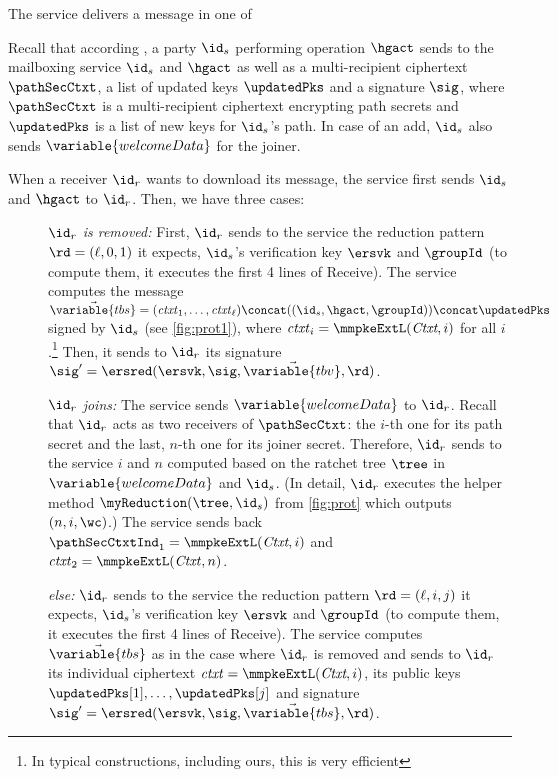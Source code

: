 The service delivers a message in one of

Recall that according \saik, a party $\id_s$ performing operation $\hgact$ sends to the mailboxing service $\id_s$ and $\hgact$ as well as a multi-recipient ciphertext $\pathSecCtxt$, a list of updated keys  $\updatedPks$ and a signature $\sig$, where $\pathSecCtxt$ is a multi-recipient ciphertext encrypting path secrets and $\updatedPks$ is a list of new keys for $\id_s$'s path. In case of an add, $\id_s$ also sends $\variable{welcomeData}$ for the joiner.

When a receiver $\id_r$ wants to download its message, the service first sends $\id_s$ and $\hgact$ to $\id_r$. Then, we have three cases:
\begin{description}
  \item[] {\it $\id_r$ is removed: } First, $\id_r$ sends to the service the reduction pattern $\rd=(\ell,0,1)$ it expects, $\id_s$'s verification key $\ersvk$ and $\groupId$ (to compute them, it executes the first 4 lines of Receive). The service computes the message $\vec{\variable{tbs}} = (\mathit{ctxt}_1,\dots,\mathit{ctxt}_\ell) \concat ((\id_s,\hgact,\groupId)) \concat \updatedPks$ signed by $\id_s$ (see \cref{fig:prot1}), where $\mathit{ctxt}_i = \mmpkeExtL(\textit{Ctxt},i)$ for all $i$.\footnote{In typical constructions, including ours, this is very efficient} Then, it sends to $\id_r$ its signature $\sig' = \ersred(\ersvk, \sig, \vec{\variable{tbv}},\rd)$.
  \item[] {\it $\id_r$ joins: } The service sends $\variable{welcomeData}$ to $\id_r$. Recall that $\id_r$ acts as two receivers of $\pathSecCtxt$: the $i$-th one for its path secret and the last, $n$-th one for its joiner secret. Therefore, $\id_r$ sends to the service $i$ and $n$ computed based on the ratchet tree $\tree$ in $\variable{welcomeData}$ and $\id_s$. (In detail, $\id_r$ executes the helper method $\myReduction(\tree, \id_s)$ from \cref{fig:prot} which outputs $(n,i,\wc)$.) The service sends back $\pathSecCtxtInd_1=\mmpkeExtL(\textit{Ctxt},i)$ and $\mathit{ctxt}_2 = \mmpkeExtL(\mathit{Ctxt},n)$.
  \item[] {\it else: } $\id_r$ sends to the service the reduction pattern $\rd=(\ell,i,j)$ it expects, $\id_s$'s verification key $\ersvk$ and $\groupId$ (to compute them, it executes the first 4 lines of Receive). The service computes $\vec{\variable{tbs}}$ as in the case where $\id_r$ is removed and sends to $\id_r$ its individual ciphertext $\mathit{ctxt} =  \mmpkeExtL(\textit{Ctxt},i)$, its public keys $\updatedPks[1], \dots, \updatedPks[j]$ and signature $\sig'  = \ersred(\ersvk, \sig, \vec{\variable{tbs}},\rd)$.
\end{description}
